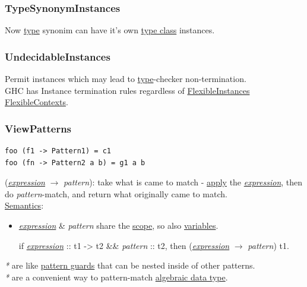 \documentclass[a4paper,14pt,oneside]{book}
\begin{document}
\subsubsection{\label{org6f938a3}TypeSynonymInstances}
\label{sec:org1d0355e}
Now \hyperref[org258d25a]{type} synonim can have it's own \hyperref[org2d16679]{type class} instances.\\

\subsubsection{\label{org82dc764}UndecidableInstances}
\label{sec:orga7448d4}
Permit instances which may lead to \hyperref[org258d25a]{type}-checker non-termination.\\

GHC has Instance termination rules regardless of \hyperref[org0a84630]{FlexibleInstances} \hyperref[org17604a1]{FlexibleContexts}.\\

\subsubsection{\label{org31c7d11}ViewPatterns}
\label{sec:org8d27068}
\begin{verbatim}
foo (f1 -> Pattern1) = c1
foo (fn -> Pattern2 a b) = g1 a b
\end{verbatim}
(\emph{\hyperref[org70841e3]{expression}} \(\to\) \emph{pattern}): take what is came to match - \hyperref[org2f1e50b]{apply} the \emph{\hyperref[org70841e3]{expression}}, then do \emph{pattern}-match, and return what originally came to match.\\

\hyperref[org83ac847]{Semantics}:\\
\begin{itemize}
\item \emph{\hyperref[org70841e3]{expression}} \& \emph{pattern} share the \hyperref[orgc03275b]{scope}, so also \hyperref[org4277fa3]{variables}.\\
\item[{if \emph{\hyperref[org70841e3]{expression}} :: t1 -> t2 \&\& \emph{pattern} :: t2, then (\emph{\hyperref[org70841e3]{expression}} \(\to\) \emph{pattern})}] t1.\\
\end{itemize}

\emph{*} are like \hyperref[org4494136]{pattern guards} that can be nested inside of other patterns.\\
\emph{*} are a convenient way to pattern-match \hyperref[orgc88dad0]{algebraic data type}.\\
\end{document}
